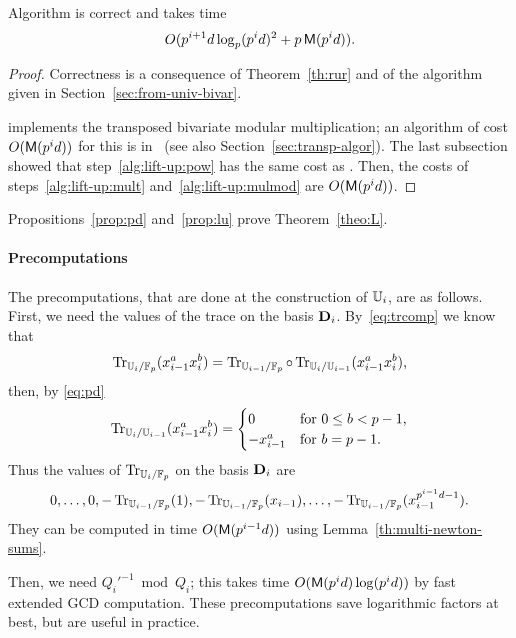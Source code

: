 \begin{proposition}\label{prop:lu}
  Algorithm \hyperref[alg:liftup]{} is correct and takes time
  \begin{equation}
    \label{eq:85}
    O(p^{i+1}d\log_p(p^id)^2+p\,\mathsf{M}(p^{i}d))
    \text{.}    
  \end{equation}
\end{proposition}
\begin{proof}
  Correctness is a consequence of Theorem~\ref{th:rur} and of the
  algorithm given in Section~\ref{sec:from-univ-bivar}.

   implements the
  transposed bivariate
  modular multiplication; an algorithm of cost $O(\mathsf{M}(p^id))$ for
  this is in~\cite[Corollary~2]{pascal+schost06} (see also
  Section~\ref{sec:transp-algor}).  The last subsection showed that
  step~\ref{alg:lift-up:pow} has the same cost as
  \hyperref[alg:push-down]{}. Then, the costs of steps~\ref{alg:lift-up:mult}
  and~\ref{alg:lift-up:mulmod} are $O(\mathsf{M}(p^id))$.
\end{proof}

Propositions~\ref{prop:pd} and~\ref{prop:lu} prove
Theorem~\ref{theo:L}.


\paragraph{Precomputations}
The precomputations, that are done at the construction of $\mathbb{U}_i$, are
as follows.  First, we need the values of the trace on the basis
$\mathbf{D}_i$. By~\eqref{eq:trcomp} we know that
\begin{equation}
  \label{eq:86}
  \operatorname{Tr}_{\mathbb{U}_i/\mathbb{F}_p}(x_{i-1}^ax_i^b) = 
  \operatorname{Tr}_{\mathbb{U}_{i-1}/\mathbb{F}_p}\circ\operatorname{Tr}_{\mathbb{U}_i/\mathbb{U}_{i-1}}(x_{i-1}^ax_i^b)
  \text{,}
\end{equation}
then, by \eqref{eq:pd}
\begin{equation}
  \label{eq:87}
  \operatorname{Tr}_{\mathbb{U}_i/\mathbb{U}_{i-1}}(x_{i-1}^ax_i^b) =
  \begin{cases}
    0 &\text{for $0\le b < p-1$,}\\
    -x_{i-1}^a &\text{for $b=p-1$.}
  \end{cases}
\end{equation}
Thus the values of $\operatorname{Tr}_{\mathbb{U}_i/\mathbb{F}_p}$ on the basis $\mathbf{D}_i$ are 
\begin{equation}
  \label{eq:88}
  0, \ldots, 0, -\operatorname{Tr}_{\mathbb{U}_{i-1}/\mathbb{F}_p}(1), -\operatorname{Tr}_{\mathbb{U}_{i-1}/\mathbb{F}_p}(x_{i-1}), \ldots, -\operatorname{Tr}_{\mathbb{U}_{i-1}/\mathbb{F}_p}(x_{i-1}^{p^{i-1}d-1})
  \text{.}
\end{equation}
They can be computed in time $O(\mathsf{M}(p^{i-1}d))$ using
Lemma~\ref{th:multi-newton-sums}.

Then, we need ${Q_i'}^{-1} \bmod Q_i$; this takes time $O(\mathsf{M}(p^id)
\log(p^id))$ by fast extended GCD computation.  These precomputations
save logarithmic factors at best, but are useful in practice.


%
